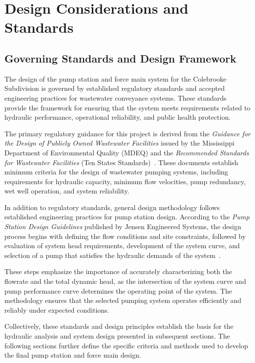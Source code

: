 \chapter{Design Considerations and Standards}

\section{Governing Standards and Design Framework}

The design of the pump station and force main system for the Colebrooke Subdivision is governed by established regulatory standards and accepted engineering practices for wastewater conveyance systems. These standards provide the framework for ensuring that the system meets requirements related to hydraulic performance, operational reliability, and public health protection.

The primary regulatory guidance for this project is derived from the \textit{Guidance for the Design of Publicly Owned Wastewater Facilities} issued by the Mississippi Department of Environmental Quality (MDEQ) and the \textit{Recommended Standards for Wastewater Facilities} (Ten States Standards)~\cite{MDEQ_DesignGuidance_2025,TenStates_RecommendedStandards_2014}. These documents establish minimum criteria for the design of wastewater pumping systems, including requirements for hydraulic capacity, minimum flow velocities, pump redundancy, wet well operation, and system reliability.

In addition to regulatory standards, general design methodology follows established engineering practices for pump station design. According to the \textit{Pump Station Design Guidelines} published by Jensen Engineered Systems, the design process begins with defining the flow conditions and site constraints, followed by evaluation of system head requirements, development of the system curve, and selection of a pump that satisfies the hydraulic demands of the system~\cite{Jensen_PumpStationDesignGuidelines_2012}.

These steps emphasize the importance of accurately characterizing both the flowrate and the total dynamic head, as the intersection of the system curve and pump performance curve determines the operating point of the system. The methodology ensures that the selected pumping system operates efficiently and reliably under expected conditions.

Collectively, these standards and design principles establish the basis for the hydraulic analysis and system design presented in subsequent sections. The following sections further define the specific criteria and methods used to develop the final pump station and force main design.

